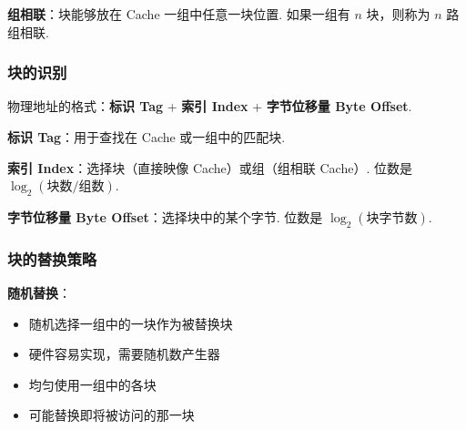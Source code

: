 \documentclass[cn, hazy, blue, normal, 12pt]{elegantnote}
\begin{document}
\textbf{组相联}：块能够放在 Cache 一组中任意一块位置. 如果一组有 $n$ 块，则称为 $n$ 路组相联.

\subsubsection{块的识别}

物理地址的格式：\textbf{标识 Tag} + \textbf{索引 Index} + \textbf{字节位移量 Byte Offset}.

\textbf{标识 Tag}：用于查找在 Cache 或一组中的匹配块.

\textbf{索引 Index}：选择块（直接映像 Cache）或组（组相联 Cache）. 位数是 $\log_2(\text{块数/组数})$.

\textbf{字节位移量 Byte Offset}：选择块中的某个字节. 位数是 $\log_2(\text{块字节数})$.

\begin{center}
\end{center}

\subsubsection{块的替换策略}

\textbf{随机替换}：
\begin{itemize}
    \item 随机选择一组中的一块作为被替换块
    \item 硬件容易实现，需要随机数产生器
    \item 均匀使用一组中的各块
    \item 可能替换即将被访问的那一块
\end{itemize}
\end{document}
